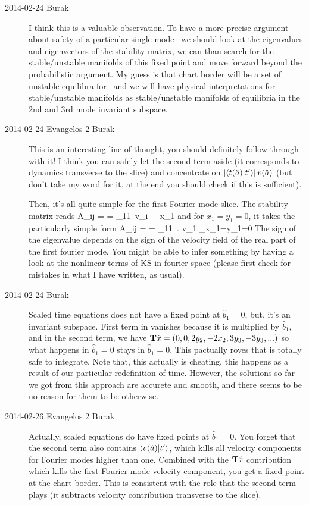 \begin{description}
\item[2014-02-24 Burak] I think this is a valuable observation. To have a
more precise argument about safety of a particular single-mode \slice\ we
should look at the eigenvalues and eigenvectors of the stability matrix,
we can than search for the stable/unstable manifolds of this fixed point
and move forward beyond the probabilistic argument. My guess is that chart
border will be a set of unstable equilibra for \KSe\ and we will have physical
interpretations for stable/unstable manifolds as stable/unstable manifolds
of equilibria in the 2nd and 3rd mode invariant subspace.

\item[2014-02-24 Evangelos 2 Burak] This is an interesting line of thought, you should
definitely follow through with it! I think you can safely let the second term aside (it corresponds
to dynamics transverse to the slice) and concentrate
on $|\braket{\groupTan(\sspRed)}{\sliceTan{}}|\, \vel(\sspRed)$
(but don't take my word for it, at the end you should check if this is sufficient).

Then, it's all quite simple for the first Fourier mode slice. The stability matrix reads
\beq
  A_{ij} =  = \delta_{11}\, v_i + x_1 
\eeq
and for $x_1=y_1=0$, it takes the particularly simple form
\beq
  A_{ij} =  = \delta_{11}\, \left. v_1\right|_{x_1=y_1=0}
\eeq
The sign of the eigenvalue depends on the sign of the velocity field of the real part of the first fourier mode.
You might be able to infer something by having a look at the nonlinear terms of KS in fourier space
(please first check for mistakes in what I have written, as usual).

\item[2014-02-24 Burak] Scaled time equations does not have a fixed point
at $\hat{b}_1 = 0$, but, it's an invariant subspace. First term in 
vanishes because it is multiplied by $\hat{b}_1$, and in the second term, we
have $\mathbf{T} \hat{x} = (0, 0, 2 y_2, -2 x_2, 3 y_3, -3 y_3, ...)$ so what happens
in $\hat{b}_1 = 0$ stays in $\hat{b}_1 = 0$. This pactually roves that 
is totally safe to integrate. Note that, this actually is cheating, this
happens as a result of our particular redefinition of time. However, the
solutions so far we got from this approach are accurete and smooth, and there
seems to be no reason for them to be otherwise.

\item[2014-02-26 Evangelos 2 Burak] Actually, scaled equations do have fixed points
at $\hat{b}_1 = 0$. You forget that the second term also
contains $\braket{\vel(\sspRed)}{\sliceTan{}}$, which kills all velocity components
for Fourier modes higher than one. Combined with the $\mathbf{T} \hat{x}$ contribution which
kills the first Fourier mode velocity component, you get a fixed point at the chart
border. This is consistent with the role that the second term plays (it subtracts
velocity contribution transverse to the slice).


\end{description}

